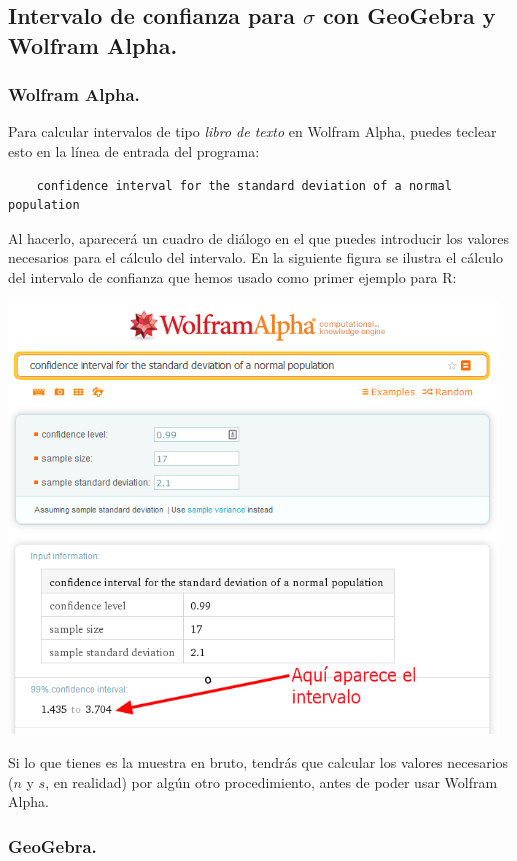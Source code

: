 \documentclass[10pt,a4paper]{article}\usepackage[]{graphicx}\usepackage[]{color}
\begin{document}
\subsection{Intervalo de confianza para $\sigma$ con GeoGebra y Wolfram Alpha.}
\label{tut06:subsec:IntConfSIgmaConGgbWolframAlpha}

\subsubsection{Wolfram Alpha.}

Para calcular intervalos de tipo {\em libro de texto} en Wolfram Alpha, puedes teclear esto en la línea de entrada del programa:
\begin{verbatim}
    confidence interval for the standard deviation of a normal population
\end{verbatim}
Al hacerlo, aparecerá un cuadro de diálogo en el que puedes introducir los valores necesarios para el cálculo del intervalo. En la siguiente figura se ilustra el cálculo del intervalo de confianza que hemos usado como primer ejemplo para R:
    \begin{center}
    \includegraphics[width=13cm]{../fig/Tut06-37.png}
    \end{center}
Si lo que tienes es la muestra en bruto, tendrás que calcular los valores necesarios ($n$ y $s$, en realidad) por algún otro procedimiento, antes de poder usar Wolfram Alpha.

\subsubsection{GeoGebra.}
\end{document}
